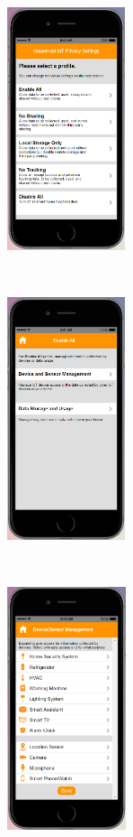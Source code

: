 \begin{figure}[htb]
	\centering
	\begin{subfigure}[t]{0.2\textwidth}
		\centering
		\includegraphics[height=2.8in]{figures/ui1sp1.png}
	\end{subfigure}%
	~~~~~
	\begin{subfigure}[t]{0.2\textwidth}
		\centering
		\includegraphics[height=2.8in]{figures/ui1sp2.png}
	\end{subfigure}%
	~~~~~
	\begin{subfigure}[t]{0.2\textwidth}
		\centering
		\includegraphics[height=2.8in]{figures/ui1sp3.png}

\end{subfigure}
\end{figure}
